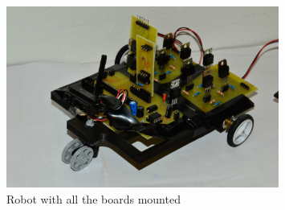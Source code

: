 \begin{figure}[!ht]
	\centering
	\includegraphics[width=0.8\textwidth]{figures/printcar2}
	\caption{Robot with all the boards mounted}
	\label{fig:car2}
\end{figure}
